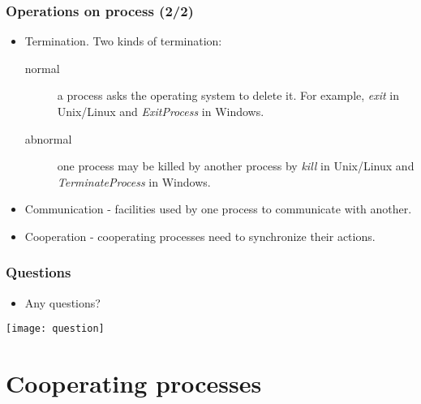 \documentclass[CJKutf8,dvipsnames,table]{beamer}
\begin{document}
\begin{CJK*}{UTF8}{song}
  \begin{frame}
  \frametitle{Operations on process (2/2)} \pause
  \begin{itemize}
  \item{Termination. \pause Two kinds of termination:} \pause
    \begin{description}
    \item[normal]{a process asks the operating system to delete it. For example, \emph{exit} in Unix/Linux and \emph{ExitProcess} in Windows.} \pause
    \item[abnormal]{one process may be killed by another process by \emph{kill} in Unix/Linux and \emph{TerminateProcess} in Windows.} \pause
    \end{description}
  \item{Communication \pause - facilities used by one process to communicate with another.} \pause
  \item{Cooperation \pause - cooperating processes need to synchronize their actions.}
  \end{itemize}
  \end{frame}

  \begin{frame}
  \frametitle{Questions}
  \begin{itemize}
  \item{Any questions?}
  \end{itemize}
  \begin{center}
    \texttt{[image: question]}
  \end{center}
  \end{frame}

  \section{Cooperating processes}


\end{CJK*}
\end{document}
